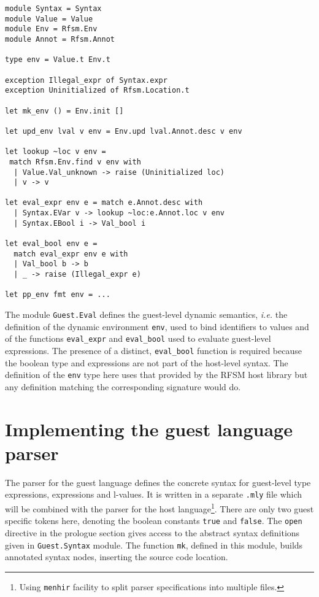 \begin{lstlisting}[language={[Objective]Caml},frame=single,basicstyle=\small,caption={Module
    \texttt{Guest.Eval} (excerpt)},label={lst:mini-eval}]
module Syntax = Syntax
module Value = Value
module Env = Rfsm.Env
module Annot = Rfsm.Annot

type env = Value.t Env.t

exception Illegal_expr of Syntax.expr
exception Uninitialized of Rfsm.Location.t

let mk_env () = Env.init []

let upd_env lval v env = Env.upd lval.Annot.desc v env

let lookup ~loc v env = 
 match Rfsm.Env.find v env with
  | Value.Val_unknown -> raise (Uninitialized loc)
  | v -> v

let eval_expr env e = match e.Annot.desc with
  | Syntax.EVar v -> lookup ~loc:e.Annot.loc v env
  | Syntax.EBool i -> Val_bool i 

let eval_bool env e = 
  match eval_expr env e with
  | Val_bool b -> b
  | _ -> raise (Illegal_expr e) 

let pp_env fmt env = ...
\end{lstlisting}

The module \verb|Guest.Eval| defines the guest-level dynamic semantics, \emph{i.e.} the definition
of the dynamic environment \texttt{env}, used to bind identifiers to values and of the 
functions \verb|eval_expr| and \verb|eval_bool| used to evaluate guest-level expressions. The
presence of a distinct, \verb|eval_bool| function is required because the boolean type and
expressions are not part of the host-level syntax. The definition of the \texttt{env} type here uses
that provided by the RFSM host library but any definition matching the corresponding signature would do.

\section{Implementing the guest language parser}

The parser for the guest language defines the concrete syntax for guest-level type expressions,
expressions and l-values. It is written in a separate \texttt{.mly} file which will be combined with the
parser for the host language\footnote{Using \texttt{menhir} facility to split parser specifications
  into multiple files.}. There are only two guest specific tokens here, denoting the boolean
constants \texttt{true} and \texttt{false}. The \texttt{open} directive in the prologue section
gives access to the abstract syntax definitions given in \texttt{Guest.Syntax} module. The function
\texttt{mk}, defined in this module, builds annotated syntax nodes, inserting the source code
location. 

